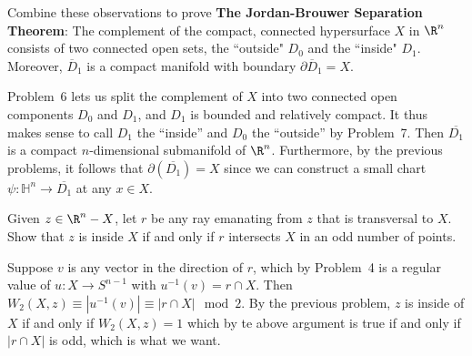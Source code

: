 \documentclass[11pt,letterpaper]{article}
\begin{document}
\begin{problem}
{Combine these observations to prove \textbf{The Jordan-Brouwer Separation Theorem}: The complement of the compact, connected hypersurface $X$ in $\R^n$ consists of two connected open sets, the ``outside" $D_0$ and the ``inside" $D_1$. Moreover, $\overline{D}_1$ is a compact manifold with boundary $\partial \overline{D}_1 = X$.}
\end{problem}
   
\begin{solution}

\quad Problem~6 lets us split the complement of $X$ into two connected open components $D_0$ and $D_1$, and $D_1$ is bounded and relatively compact. It thus makes sense to call $D_1$ the ``inside'' and $D_0$ the ``outside'' by Problem~7. Then $\overline{D_1}$ is a compact $n$-dimensional submanifold of $\R^n$. Furthermore, by the previous problems, it follows that $\partial(\overline{D_1})=X$ since we can construct a small chart $\psi : \mathbb{H}^n \to \overline{D_1}$ at any $x\in X$.

\end{solution}

\begin{problem}
    {Given $z \in \R^n-X$, let $r$ be any ray emanating from $z$ that is transversal to $X$. Show that $z$ is inside $X$ if and only if $r$ intersects $X$ in an odd number of points.}
\end{problem}

\begin{solution}
    \quad Suppose $v$ is any vector in the direction of $r$, which by Problem~4 is a regular value of $u : X \to S^{n-1}$ with $u^{-1}(v) = r\cap X$. Then $W_2(X,z)\equiv |u^{-1}(v)|\equiv |r\cap X|\mod 2.$
    By the previous problem, $z$ is inside of $X$ if and only if $W_2(X,z)=1$ which by te above argument is true if and only if $|r\cap X|$ is odd, which is what we want.
\end{solution}
\end{document}
